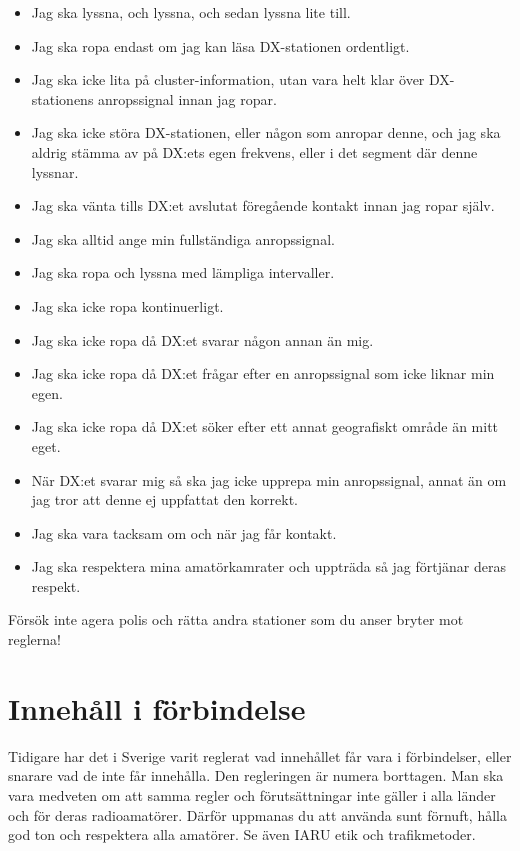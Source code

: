\begin{itemize}
\item Jag ska lyssna, och lyssna, och sedan lyssna lite till.
\item Jag ska ropa endast om jag kan läsa DX-sta\-tion\-en ordentligt.
\item Jag ska icke lita på cluster-information, utan vara helt klar över DX-stationens anropssignal innan jag ropar.
\item Jag ska icke störa DX-stationen, eller någon som anropar denne, och jag ska aldrig stämma av på DX:ets egen frekvens, eller i det segment där denne lyssnar.
\item Jag ska vänta tills DX:et avslutat föregående kontakt innan jag ropar själv.
\item Jag ska alltid ange min fullständiga anropssignal.
\item Jag ska ropa och lyssna med lämpliga intervaller.
\item Jag ska icke ropa kontinuerligt.
\item Jag ska icke ropa då DX:et svarar någon annan än mig.
\item Jag ska icke ropa då DX:et frågar efter en anropssignal som icke liknar min egen.
\item Jag ska icke ropa då DX:et söker efter ett annat geografiskt område än mitt eget.
\item När DX:et svarar mig så ska jag icke upprepa min anropssignal, annat än om jag tror att denne ej uppfattat den korrekt.
\item Jag ska vara tacksam om och när jag får kontakt.
\item Jag ska respektera mina amatörkamrater och uppträda så jag förtjänar deras respekt.
\end{itemize}

Försök inte agera polis och rätta andra stationer som du anser bryter mot reglerna!

\section{Innehåll i förbindelse}
\label{innehåll i förbindelse}

Tidigare har det i Sverige varit reglerat vad innehållet får vara i
förbindelser, eller snarare vad de inte får innehålla.
Den regleringen är numera borttagen.
Man ska vara medveten om att samma regler och förutsättningar inte gäller i
alla länder och för deras radioamatörer.
Därför uppmanas du att använda sunt förnuft, hålla god ton och respektera alla
amatörer.
Se även IARU etik och trafikmetoder.

